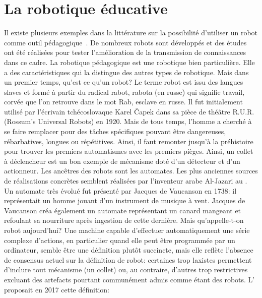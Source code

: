\section{La robotique éducative}
        Il existe plusieurs exemples dans la littérature sur la possibilité d'utiliser un robot comme outil pédagogique~. De nombreux robots sont développés et des études ont été réalisées pour tester l'amélioration de la transmission de connaissances dans ce cadre.
        La robotique pédagogique est une robotique bien particulière. Elle a des caractéristiques qui la distingue des autres types de robotique. Mais dans un premier temps, qu'est ce qu'un robot?
            Le terme robot est issu des langues slaves et formé à partir du radical rabot, rabota (en russe) qui signifie travail, corvée que l'on retrouve dans le mot Rab, esclave en russe. Il fut initialement utilisé par l’écrivain tchécoslovaque Karel Čapek dans sa pièce de théâtre R.U.R. (Rossum's Universal Robots) en 1920. Mais de tous temps, l’homme a cherché à se faire remplacer pour des tâches spécifiques pouvant être dangereuses, rébarbatives, longues ou répétitives. Ainsi, il faut remonter jusqu’à la préhistoire pour trouver les premiers automatismes avec les premiers pièges. Ainsi, un collet à déclencheur est un bon exemple de mécanisme doté d’un détecteur et d’un actionneur.
            Les ancêtres des robots sont les automates. Les plus anciennes sources de réalisations concrètes semblent réalisées par l'inventeur arabe Al-Jazari au . Un automate très évolué fut présenté par Jacques de Vaucanson en 1738: il représentait un homme jouant d’un instrument de musique à vent. Jacques de Vaucanson créa également un automate représentant un canard mangeant et refoulant sa nourriture après ingestion de cette dernière.
            Mais qu'appelle-t-on robot aujourd'hui?
            Une machine capable d’effectuer automatiquement une série complexe d’actions, en particulier quand elle peut être programmée par un ordinateur, semble être une définition plutôt succincte, mais elle reflète l'absence de consensus actuel sur la définition de robot: certaines trop laxistes permettent d'inclure tout mécanisme (\eg un collet) ou, au contraire, d'autres trop restrictives excluant des artefacts pourtant communément admis comme étant des robots. L' proposait en 2017 cette définition:
